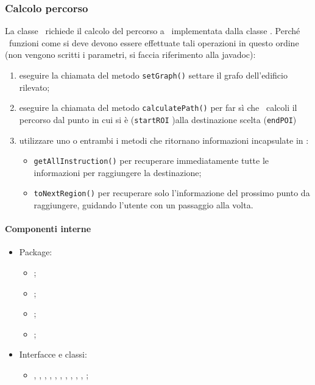\documentclass[../Funzionalita.tex]{subfiles}
\begin{document}
		\subsubsection{Calcolo percorso}
			La classe \NavigationManagerImp\ richiede il calcolo del percorso a \Navigator\ implementata dalla classe \NavigatorImp. Perché \NavigatorImp\ funzioni come si deve devono essere effettuate tali operazioni in questo ordine (non vengono scritti i parametri, si faccia riferimento alla javadoc):
			\begin{enumerate}
				\item eseguire la chiamata del metodo \lstinline|setGraph()| settare il grafo dell'edificio rilevato;
				\item eseguire la chiamata del metodo \lstinline|calculatePath()| per far sì che \NavigatorImp\ calcoli il percorso dal punto in cui si è (\lstinline|startROI| )alla destinazione scelta (\lstinline|endPOI|)
				\item utilizzare uno o entrambi i metodi che ritornano informazioni incapsulate in \ProcessedInformation:
				\begin{itemize}
					\item \lstinline|getAllInstruction()| per recuperare immediatamente tutte le informazioni per raggiungere la destinazione;
					\item \lstinline|toNextRegion()| per recuperare solo l'informazione del prossimo punto da raggiungere, guidando l'utente con un passaggio alla volta.
				\end{itemize}
			\end{enumerate}
		
			\paragraph*{Componenti interne}
			\begin{itemize}
			
				\item Package:
				\begin{itemize}
					\item[] \navigator;
					\item[] \algorithm;
					\item[] \graph;
					\item[] \area;
				\end{itemize}
				
				\item Interfacce e classi:
				\begin{itemize}
					\item[] \Navigator, \NavigatorImp, \ProcessedInformation, \ProcessedInformationImp, \PathFinder, \DijkstraPathFinder, \Compass, \MapGraph, \EnrichedEdge, \PointOfInterest, \RegionOfInterest;
				\end{itemize}
				
			\end{itemize}
			
\end{document}
